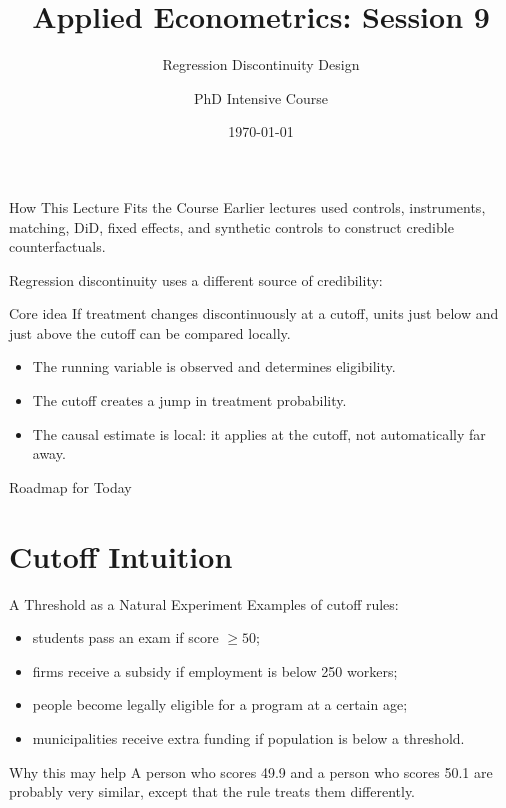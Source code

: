 \documentclass[11pt,aspectratio=169]{beamer}
\title{Applied Econometrics: Session 9}
\subtitle{Regression Discontinuity Design}
\author{PhD Intensive Course}
\institute{Lecture 9}
\date{\today}
\begin{document}
\begin{frame}
  \titlepage
\end{frame}

\begin{frame}{How This Lecture Fits the Course}
  Earlier lectures used controls, instruments, matching, DiD, fixed effects, and synthetic controls to construct credible counterfactuals.
  \vspace{0.4em}

  Regression discontinuity uses a different source of credibility:
  \begin{block}{Core idea}
    If treatment changes discontinuously at a cutoff, units just below and just above the cutoff can be compared locally.
  \end{block}

  \begin{itemize}
    \item The running variable is observed and determines eligibility.
    \item The cutoff creates a jump in treatment probability.
    \item The causal estimate is local: it applies at the cutoff, not automatically far away.
  \end{itemize}
\end{frame}

\begin{frame}{Roadmap for Today}
  \tableofcontents
\end{frame}

\section{Cutoff Intuition}

\begin{frame}{A Threshold as a Natural Experiment}
  Examples of cutoff rules:
  \begin{itemize}
    \item students pass an exam if score \(\geq 50\);
    \item firms receive a subsidy if employment is below 250 workers;
    \item people become legally eligible for a program at a certain age;
    \item municipalities receive extra funding if population is below a threshold.
  \end{itemize}
  \begin{block}{Why this may help}
    A person who scores 49.9 and a person who scores 50.1 are probably very similar, except that the rule treats them differently.
  \end{block}
\end{frame}
\end{document}
